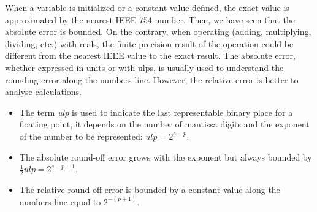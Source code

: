 When a variable is initialized or a constant value defined, the exact value is approximated by the nearest IEEE 754 number. Then, we have seen that the absolute error is bounded. 
On the contrary, when operating (adding, multiplying, dividing, etc.) with reals, the finite precision result of the operation could be different from the nearest IEEE value to the exact result.
The absolute error, whether expressed in units or with ulps, is usually used to understand the rounding error along the numbers line. However, the relative error is better to analyse calculations.  

\begin{IN}
    \begin{itemize}
        \item The term \textit{ulp} is used to indicate the last representable binary place for a floating point, it depends on the number of mantissa digits and the exponent of the number to be represented: $ulp = 2^{e-p}$. 
        \item The absolute round-off error grows with the exponent but always bounded by $\frac{1}{2} ulp = 2^{e-p-1}$.
        \item The relative round-off error is bounded by a constant value along the numbers line equal to $2^{-(p+1)}$.
    \end{itemize}   
\end{IN} 









